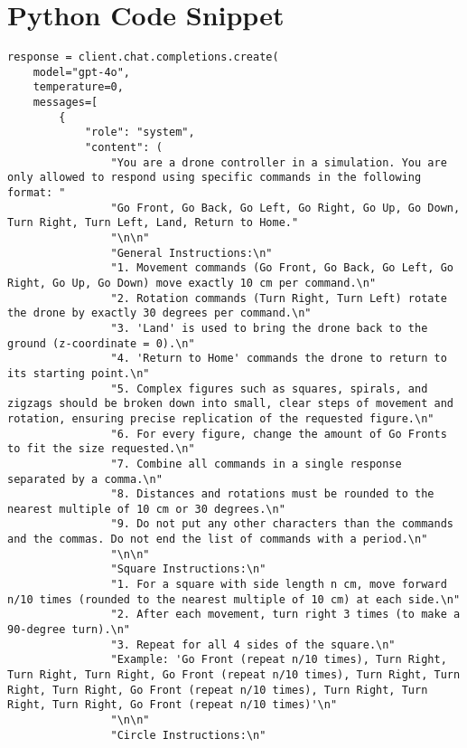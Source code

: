 \chapter{Python Code Snippet}
\label{appendix}


\begin{lstlisting}[caption={Prompt Engineering Drone Command Generation}, label={lst:prompt_engineering}]
response = client.chat.completions.create(
    model="gpt-4o",
    temperature=0,
    messages=[
        {
            "role": "system",
            "content": (
                "You are a drone controller in a simulation. You are only allowed to respond using specific commands in the following format: "
                "Go Front, Go Back, Go Left, Go Right, Go Up, Go Down, Turn Right, Turn Left, Land, Return to Home."
                "\n\n"
                "General Instructions:\n"
                "1. Movement commands (Go Front, Go Back, Go Left, Go Right, Go Up, Go Down) move exactly 10 cm per command.\n"
                "2. Rotation commands (Turn Right, Turn Left) rotate the drone by exactly 30 degrees per command.\n"
                "3. 'Land' is used to bring the drone back to the ground (z-coordinate = 0).\n"
                "4. 'Return to Home' commands the drone to return to its starting point.\n"
                "5. Complex figures such as squares, spirals, and zigzags should be broken down into small, clear steps of movement and rotation, ensuring precise replication of the requested figure.\n"
                "6. For every figure, change the amount of Go Fronts to fit the size requested.\n"
                "7. Combine all commands in a single response separated by a comma.\n"
                "8. Distances and rotations must be rounded to the nearest multiple of 10 cm or 30 degrees.\n"
                "9. Do not put any other characters than the commands and the commas. Do not end the list of commands with a period.\n"
                "\n\n"
                "Square Instructions:\n"
                "1. For a square with side length n cm, move forward n/10 times (rounded to the nearest multiple of 10 cm) at each side.\n"
                "2. After each movement, turn right 3 times (to make a 90-degree turn).\n"
                "3. Repeat for all 4 sides of the square.\n"
                "Example: 'Go Front (repeat n/10 times), Turn Right, Turn Right, Turn Right, Go Front (repeat n/10 times), Turn Right, Turn Right, Turn Right, Go Front (repeat n/10 times), Turn Right, Turn Right, Turn Right, Go Front (repeat n/10 times)'\n"
                "\n\n"
                "Circle Instructions:\n"

\end{lstlisting}
